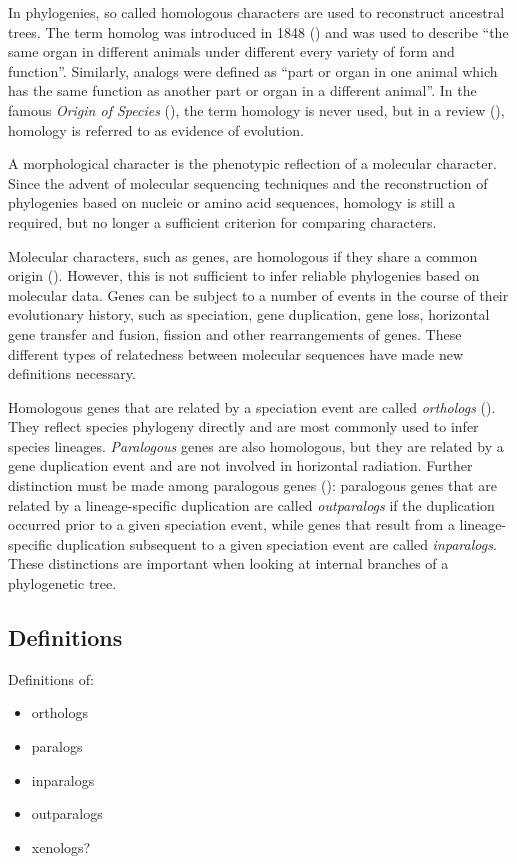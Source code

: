 In phylogenies, so called homologous characters are used to reconstruct
ancestral trees. The term homolog was introduced in 1848 (\cite{owen1848}) and
was used to describe ``the same organ in different animals under different every
variety of form and function''. Similarly, analogs were defined as ``part or
organ in one animal which has the same function as another part or organ in a
different animal''. In the famous \emph{Origin of Species} (\cite{darwin1859}),
the term homology is never used, but in a review (\cite{owen1860}), homology is
referred to as evidence of evolution.

A morphological character is the phenotypic reflection of a molecular character.
Since the advent of molecular sequencing techniques and the reconstruction of
phylogenies based on nucleic or amino acid sequences, homology is still a required,
but no longer a sufficient criterion for comparing characters.

Molecular characters, such as genes, are homologous if they share a common
origin (\cite{koonin2005}). However, this is not sufficient to infer reliable
phylogenies based on molecular data. Genes can be subject to a number of events
in the course of their evolutionary history, such as speciation, gene
duplication, gene loss, horizontal gene transfer and fusion, fission and other
rearrangements of genes. These different types of relatedness between molecular
sequences have made new definitions necessary.

Homologous genes that are related by a speciation event are called
\emph{orthologs} (\cite{fitch1970}). They reflect species phylogeny directly and
are most commonly used to infer species lineages. \emph{Paralogous} genes are
also homologous, but they are related by a gene duplication event and are not
involved in horizontal radiation. Further distinction must be made among
paralogous genes (\cite{sonnhammer2002}): paralogous genes that are related by a
lineage-specific duplication are called \emph{outparalogs} if the duplication
occurred prior to a given speciation event, while genes that result from a
lineage-specific duplication subsequent to a given speciation event are called
\emph{inparalogs}.  These distinctions are important when looking at internal
branches of a phylogenetic tree.


\subsection{Definitions}

Definitions of:
\begin{itemize}
	\item orthologs
	\item paralogs
	\item inparalogs
	\item outparalogs
	\item xenologs?
\end{itemize}

